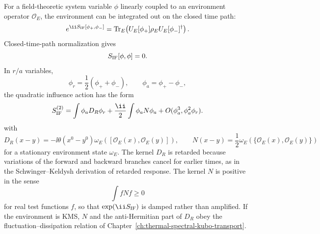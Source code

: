 For a field-theoretic system variable \(\phi\) linearly coupled to an
environment operator \(\mathcal O_E\), the environment can be integrated out
on the closed time path:
\[
  e^{\ii S_{\rm IF}[\phi_+,\phi_-]}
  =
  \operatorname{Tr}_E\!\left(
  U_E[\phi_+]\rho_EU_E[\phi_-]^\dagger
  \right).
\]
Closed-time-path normalization gives
\[
  S_{\rm IF}[\phi,\phi]=0.
\]
In \(r/a\) variables,
\[
  \phi_r=\frac12(\phi_++\phi_-),
  \qquad
  \phi_a=\phi_+-\phi_-,
\]
the quadratic influence action has the form
\begin{equation}
  S_{\rm IF}^{(2)}
  =
  \int \phi_a D_R\phi_r
  +\frac{\ii}{2}\int \phi_aN\phi_a
  +O(\phi_a^3,\phi_a^2\phi_r).
  \label{eq:open-system-quadratic-influence}
\end{equation}
with
\[
  D_R(x-y)=-\ii\theta(x^0-y^0)
  \omega_E([\mathcal O_E(x),\mathcal O_E(y)]),
  \qquad
  N(x-y)=\frac12
  \omega_E(\{\mathcal O_E(x),\mathcal O_E(y)\})
\]
for a stationary environment state \(\omega_E\).  The kernel \(D_R\) is
retarded because variations of the forward and backward branches cancel for
earlier times, as in the Schwinger--Keldysh derivation of retarded response.
The kernel \(N\) is positive in the sense
\[
  \int f N f\ge0
\]
for real test functions \(f\), so that
\(\exp(\ii S_{\rm IF})\) is damped rather than amplified.  If the
environment is KMS, \(N\) and the anti-Hermitian part of \(D_R\) obey the
fluctuation--dissipation relation of
Chapter~\ref{ch:thermal-spectral-kubo-transport}.

